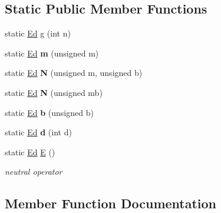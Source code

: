 \subsection*{Static Public Member Functions}
\begin{DoxyCompactItemize}
\item 
static \mbox{\hyperlink{classetvo_i_i_1_1_ed}{Ed}} \mbox{\hyperlink{classetvo_i_i_1_1_ed_a18b447baa048365da400ebf03ce2d978}{g}} (int n)
\item 
\mbox{\label{classetvo_i_i_1_1_ed_a49fa4b3917fa54c5a7334e9c130e9b36}} 
static \mbox{\hyperlink{classetvo_i_i_1_1_ed}{Ed}} {\bfseries m} (unsigned m)
\item 
\mbox{\label{classetvo_i_i_1_1_ed_a14693b931b050ddefcf19aa961b07269}} 
static \mbox{\hyperlink{classetvo_i_i_1_1_ed}{Ed}} {\bfseries N} (unsigned m, unsigned b)
\item 
\mbox{\label{classetvo_i_i_1_1_ed_a176790ecf697586d86f5459e1b45f096}} 
static \mbox{\hyperlink{classetvo_i_i_1_1_ed}{Ed}} {\bfseries N} (unsigned mb)
\item 
\mbox{\label{classetvo_i_i_1_1_ed_a6392a8b0b3f15e58996242fdfbce5eb4}} 
static \mbox{\hyperlink{classetvo_i_i_1_1_ed}{Ed}} {\bfseries b} (unsigned b)
\item 
\mbox{\label{classetvo_i_i_1_1_ed_aabb689c44db30af31ec5a9eae50174ed}} 
static \mbox{\hyperlink{classetvo_i_i_1_1_ed}{Ed}} {\bfseries d} (int d)
\item 
\mbox{\label{classetvo_i_i_1_1_ed_a394dda52058fa926ccd39b867ec033ab}} 
static \mbox{\hyperlink{classetvo_i_i_1_1_ed}{Ed}} \mbox{\hyperlink{classetvo_i_i_1_1_ed_a394dda52058fa926ccd39b867ec033ab}{E}} ()
\begin{DoxyCompactList}\small\item\em neutral operator \end{DoxyCompactList}\end{DoxyCompactItemize}


\subsection{Member Function Documentation}
\mbox{\label{classetvo_i_i_1_1_ed_a18b447baa048365da400ebf03ce2d978}} 
